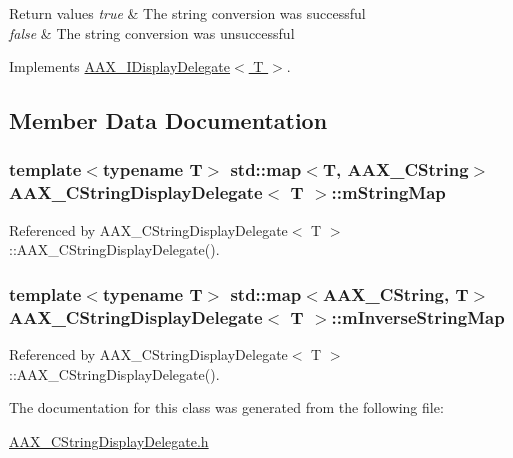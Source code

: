 \begin{DoxyRetVals}{Return values}
{\em true} & The string conversion was successful \\
\hline
{\em false} & The string conversion was unsuccessful \\
\hline
\end{DoxyRetVals}


Implements \hyperlink{a00092_aed5224775c9f733f091afddfba057d5e}{A\+A\+X\+\_\+\+I\+Display\+Delegate$<$ T $>$}.



\subsection{Member Data Documentation}
\hypertarget{a00044_aba142c61f06272adbaed051751d96123}{}
\subsubsection[{m\+String\+Map}]{\setlength{\rightskip}{0pt plus 5cm}template$<$typename T$>$ std\+::map$<$T, {\bf A\+A\+X\+\_\+\+C\+String}$>$ {\bf A\+A\+X\+\_\+\+C\+String\+Display\+Delegate}$<$ T $>$\+::m\+String\+Map\hspace{0.3cm}{\ttfamily [protected]}}\label{a00044_aba142c61f06272adbaed051751d96123}


Referenced by A\+A\+X\+\_\+\+C\+String\+Display\+Delegate$<$ T $>$\+::\+A\+A\+X\+\_\+\+C\+String\+Display\+Delegate().

\hypertarget{a00044_a388606665c60b57c16152b0424c54e2e}{}
\subsubsection[{m\+Inverse\+String\+Map}]{\setlength{\rightskip}{0pt plus 5cm}template$<$typename T$>$ std\+::map$<${\bf A\+A\+X\+\_\+\+C\+String}, T$>$ {\bf A\+A\+X\+\_\+\+C\+String\+Display\+Delegate}$<$ T $>$\+::m\+Inverse\+String\+Map\hspace{0.3cm}{\ttfamily [protected]}}\label{a00044_a388606665c60b57c16152b0424c54e2e}


Referenced by A\+A\+X\+\_\+\+C\+String\+Display\+Delegate$<$ T $>$\+::\+A\+A\+X\+\_\+\+C\+String\+Display\+Delegate().



The documentation for this class was generated from the following file\+:\begin{DoxyCompactItemize}
\item 
\hyperlink{a00198}{A\+A\+X\+\_\+\+C\+String\+Display\+Delegate.\+h}\end{DoxyCompactItemize}
